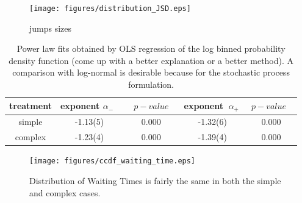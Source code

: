 \begin{figure}[h!]
\begin{center}
\texttt{[image: figures/distribution\_JSD.eps]}
\caption{jumps sizes}
\label{fig:jump_sizes_new}
\end{center}
\end{figure}

\begin{table}
  \centering 
  \begin{tabular}{|c|c|c|c|c|}
	\hline
   treatment & exponent $\alpha_{-}$~&~$~p-value~$~& exponent $~\alpha_{+}~$ & $~p-value~$~\\
   \hline
  simple  & -1.13(5) & 0.000 &  -1.32(6) & 0.000\\
  complex &  -1.23(4) & 0.000 & -1.39(4) & 0.000\\
\hline
\end{tabular}
  \caption{Power law fits obtained by OLS regression of the log binned probability density function (come up with a better explanation or a better method). A comparison with log-normal is desirable because for the stochastic process formulation.}
  \label{pwlaw_fits}
\end{table}

\begin{figure}[h!]
\begin{center}
\texttt{[image: figures/ccdf\_waiting\_time.eps]}
\caption{Distribution of Waiting Times is fairly the same in both the simple and complex cases.}
\label{fig:waiting_times}
\end{center}
\end{figure}


